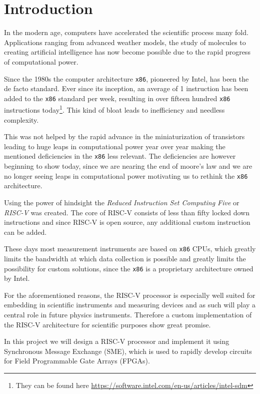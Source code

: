 \chapter{Introduction}
    In the modern age, computers have accelerated the scientific process many fold. Applications ranging from advanced weather models, the study of molecules to creating artificial intelligence has now become possible due to the rapid progress of computational power.
    
    Since the 1980s the computer architecture \texttt{x86}, pioneered by Intel, has been the de facto standard. 
    Ever since its inception, an average of 1 instruction has been added to the \texttt{x86} standard per week, resulting in over fifteen hundred \texttt{x86} instructions today\footnote{They can be found here \url{https://software.intel.com/en-us/articles/intel-sdm}}. This kind of bloat leads to inefficiency and needless complexity.
    
    This was not helped by the rapid advance in the miniaturization of transistors leading to huge leaps in computational power year over year making the mentioned deficiencies in the \texttt{x86} less relevant. The deficiencies are however beginning to show today, since we are nearing the end of moore’s law and we are no longer seeing leaps in computational power motivating us to rethink the \texttt{x86} architecture.
    
    Using the power of hindsight the \textit{Reduced Instruction Set Computing Five} or \textit{RISC-V} was created. The core of RISC-V consists of less than fifty locked down instructions and since RISC-V is open source, any additional custom instruction can be added.
    
    
    These days most measurement instruments are based on \texttt{x86} CPUs, which greatly limits the bandwidth at which data collection is possible and greatly limits the possibility for custom solutions, since the \texttt{x86} is a proprietary architecture owned by Intel. 
    
    For the aforementioned reasons, the RISC-V processor is especially well suited for embedding in scientific instruments and measuring devices and as such will play a central role in future physics instruments.
    Therefore a custom implementation of the RISC-V architecture for scientific purposes show great promise. 
    
    In this project we will design a RISC-V processor and implement it using Synchronous Message Exchange (SME), which is used to rapidly develop circuits for Field Programmable Gate Arrays (FPGAs).